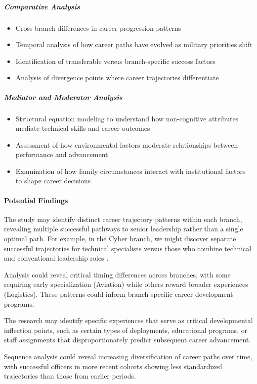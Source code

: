 \documentclass[../main.tex]{subfiles}
\begin{document}
\subparagraph{Comparative Analysis}
\begin{itemize}
\item Cross-branch differences in career progression patterns
\item Temporal analysis of how career paths have evolved as military priorities shift
\item Identification of transferable versus branch-specific success factors
\item Analysis of divergence points where career trajectories differentiate
\end{itemize}

\subparagraph{Mediator and Moderator Analysis}
\begin{itemize}
\item Structural equation modeling to understand how non-cognitive attributes mediate technical skills and career outcomes
\item Assessment of how environmental factors moderate relationships between performance and advancement
\item Examination of how family circumstances interact with institutional factors to shape career decisions
\end{itemize}

\paragraph{Potential Findings}

The study may identify distinct career trajectory patterns within each branch, revealing multiple successful pathways to senior leadership rather than a single optimal path. For example, in the Cyber branch, we might discover separate successful trajectories for technical specialists versus those who combine technical and conventional leadership roles \cite{joseph2012career}.

Analysis could reveal critical timing differences across branches, with some requiring early specialization (Aviation) while others reward broader experiences (Logistics). These patterns could inform branch-specific career development programs.

The research may identify specific experiences that serve as critical developmental inflection points, such as certain types of deployments, educational programs, or staff assignments that disproportionately predict subsequent career advancement.

Sequence analysis could reveal increasing diversification of career paths over time, with successful officers in more recent cohorts showing less standardized trajectories than those from earlier periods.
\end{document}
